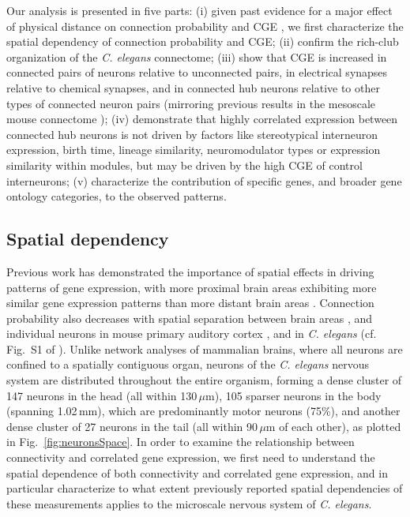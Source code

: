 \documentclass[10pt,letterpaper]{article}
\begin{document}
Our analysis is presented in five parts:
(i) given past evidence for a major effect of physical distance on connection probability and CGE \cite{Fulcher:2016ck}, we first characterize the spatial dependency of connection probability and CGE;
(ii) confirm the rich-club organization of the \emph{C. elegans} connectome;
(iii) show that CGE is increased in connected pairs of neurons relative to unconnected pairs, in electrical synapses relative to chemical synapses, and in connected hub neurons relative to other types of connected neuron pairs (mirroring previous results in the mesoscale mouse connectome \cite{Fulcher:2016ck});
(iv) demonstrate that highly correlated expression between connected hub neurons is not driven by factors like stereotypical interneuron expression, birth time, lineage similarity, neuromodulator types or expression similarity within modules, but may be driven by the high CGE of control interneurons;
(v) characterize the contribution of specific genes, and broader gene ontology categories, to the observed patterns.


\subsection*{Spatial dependency}
Previous work has demonstrated the importance of spatial effects in driving patterns of gene expression, with more proximal brain areas exhibiting more similar gene expression patterns than more distant brain areas \cite{Krienen:2016eq, Fulcher:2016ck, Pantazatos:2016ir, Richiardi:2017hb}.
Connection probability also decreases with spatial separation between brain areas \cite{Horvat:2016ia, Wang:2016gg, Markov:2013jo, Henderson:2014fg, Fulcher:2016ck, Noori:2017ce}, and individual neurons in mouse primary auditory cortex \cite{Levy:2012dy}, and in \emph{C. elegans} (cf. Fig.~S1 of \cite{Azulay:2016cg}).
Unlike network analyses of mammalian brains, where all neurons are confined to a spatially contiguous organ, neurons of the \emph{C. elegans} nervous system are distributed throughout the entire organism, forming a dense cluster of 147 neurons in the head (all within 130\,$\mu$m), 105 sparser neurons in the body (spanning 1.02\,mm), which are predominantly motor neurons (75\%), and another dense cluster of 27 neurons in the tail (all within 90\,$\mu$m of each other), as plotted in Fig.~\ref{fig:neuronsSpace}.
In order to examine the relationship between connectivity and correlated gene expression, we first need to understand the spatial dependence of both connectivity and correlated gene expression, and in particular characterize to what extent previously reported spatial dependencies of these measurements applies to the microscale nervous system of \emph{C. elegans}.
\end{document}
